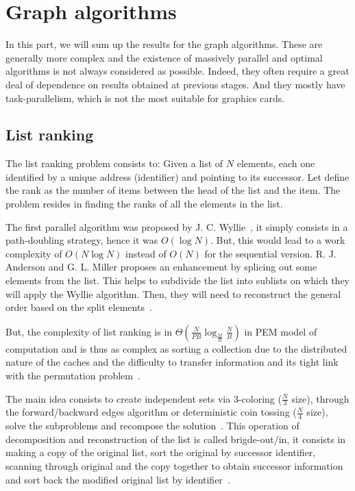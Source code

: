 

\section{Graph algorithms}

In this part, we will sum up the results for the graph algorithms. These are generally more complex and the existence of massively parallel and optimal algorithms is not always considered as possible. Indeed, they often require a great deal of dependence on results obtained at previous stages. And they mostly have task-parallelism, which is not the most suitable for graphics cards.

\subsection{List ranking}

The list ranking problem consists to:
Given a list of $N$ elements, each one identified by a unique address (identifier) and pointing to its successor. Let define the rank as the number of items between the head of the list and the item. The problem resides in finding the ranks of all the elements in the list.

The first parallel algorithm was proposed by J. C. Wyllie~\cite{wyllie1979complexity}, it simply consists in a path-doubling strategy, hence it was $O(\log N)$. But, this would lead to a work complexity of $O(N \log N)$ instead of $O(N)$ for the sequential version. R. J. Anderson and G. L. Miller proposes an enhancement by splicing out some elements from the list. This helps to subdivide the list into sublists on which they will apply the Wyllie algorithm. Then, they will need to reconstruct the general order based on the split elements~\cite{anderson1990simple}.

But, the complexity of list ranking is in $\Theta(\frac{N}{PB} \log_{\frac{M}{B}} \frac{N}{B})$ in PEM model of computation and is thus as complex as sorting a collection due to the distributed nature of the caches and the difficulty to transfer information and its tight link with the permutation problem~\cite{jacob2014complexity}.

The main idea consists to create independent sets via 3-coloring ($\frac{N}{3}$ size), through the forward/backward edges algorithm or deterministic coin tossing ($\frac{N}{4}$ size), solve the subproblems and recompose the solution~\cite{chiang1995external}. This operation of decomposition and reconstruction of the list is called brigde-out/in, it consists in making a copy of the original list, sort the original by successor identifier, scanning through original and the copy together to obtain successor information and sort back the modified original list by identifier~\cite{jacob2014complexity}.

